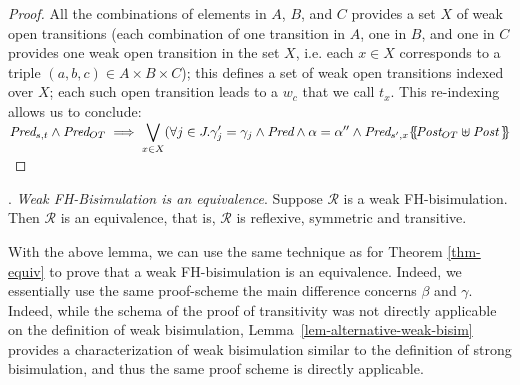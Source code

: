 \documentclass{lmcs}
\begin{document}
\begin{proof}
All the combinations of elements in $A$, $B$, and $C$ provides a set $X$ of weak open transitions (each combination of one transition in $A$, one in $B$, and one in $C$ provides one weak open transition in the set $X$, i.e. each $x\in X$ corresponds to a triple $(a,b,c)\in A\times B\times C$); this defines a set of weak open transitions indexed over $X$;  each such open transition leads to a $w_c$ that we call $t_x$. This re-indexing allows us to conclude:\\
$\Pred_{s,t} \land \Pred_{OT}\implies
 \displaystyle{\bigvee_{x\in X}} 
(\forall j\in J.\gamma_j'=\gamma_j \land  \Pred \land \alpha=\alpha''  \land \Pred_{s',x}\subst{\Post_{OT}\uplus\Post\,}$\\
\end{proof}


\fussy
{}. \emph{Weak FH-Bisimulation is an equivalence}.
 Suppose $\mathcal{R}$ 
is a weak FH-bisimulation. Then $\mathcal{R}$ is an equivalence, that is, $\mathcal{R}$ is 
reflexive, symmetric and transitive.
\sloppy

With the above lemma, we can use the same technique as for Theorem \ref{thm-equiv}  to prove that a weak FH-bisimulation is an equivalence. Indeed, we essentially use the same proof-scheme the main difference concerns  $\beta$ and  $\gamma$. Indeed, while the schema of the proof of transitivity was not directly applicable on the definition of weak bisimulation,  Lemma~\ref{lem-alternative-weak-bisim} provides a characterization of weak bisimulation similar to the definition of strong bisimulation, and thus the same proof scheme is directly applicable.

 

       		



       		
\end{document}
